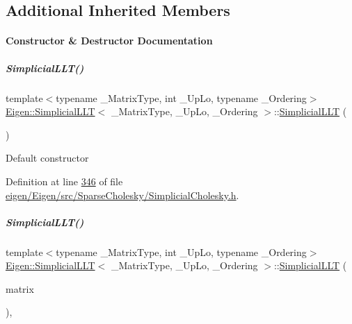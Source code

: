 \subsection*{Additional Inherited Members}


\paragraph{Constructor \& Destructor Documentation}
\mbox{\label{group___sparse_cholesky___module_ad25633e34d7c21b77fe05c873ffbe416}} 
\subparagraph{\texorpdfstring{Simplicial\+L\+L\+T()}{SimplicialLLT()}\hspace{0.1cm}{\footnotesize\ttfamily [1/4]}}
{\footnotesize\ttfamily template$<$typename \+\_\+\+Matrix\+Type, int \+\_\+\+Up\+Lo, typename \+\_\+\+Ordering$>$ \\
\hyperlink{group___sparse_cholesky___module_class_eigen_1_1_simplicial_l_l_t}{Eigen\+::\+Simplicial\+L\+LT}$<$ \+\_\+\+Matrix\+Type, \+\_\+\+Up\+Lo, \+\_\+\+Ordering $>$\+::\hyperlink{group___sparse_cholesky___module_class_eigen_1_1_simplicial_l_l_t}{Simplicial\+L\+LT} (\begin{DoxyParamCaption}{ }\end{DoxyParamCaption})\hspace{0.3cm}{\ttfamily [inline]}}

Default constructor 

Definition at line \hyperlink{eigen_2_eigen_2src_2_sparse_cholesky_2_simplicial_cholesky_8h_source_l00346}{346} of file \hyperlink{eigen_2_eigen_2src_2_sparse_cholesky_2_simplicial_cholesky_8h_source}{eigen/\+Eigen/src/\+Sparse\+Cholesky/\+Simplicial\+Cholesky.\+h}.

\mbox{\label{group___sparse_cholesky___module_a342735f17d0306aa5581e91010091427}} 
\subparagraph{\texorpdfstring{Simplicial\+L\+L\+T()}{SimplicialLLT()}\hspace{0.1cm}{\footnotesize\ttfamily [2/4]}}
{\footnotesize\ttfamily template$<$typename \+\_\+\+Matrix\+Type, int \+\_\+\+Up\+Lo, typename \+\_\+\+Ordering$>$ \\
\hyperlink{group___sparse_cholesky___module_class_eigen_1_1_simplicial_l_l_t}{Eigen\+::\+Simplicial\+L\+LT}$<$ \+\_\+\+Matrix\+Type, \+\_\+\+Up\+Lo, \+\_\+\+Ordering $>$\+::\hyperlink{group___sparse_cholesky___module_class_eigen_1_1_simplicial_l_l_t}{Simplicial\+L\+LT} (\begin{DoxyParamCaption}\item[{const Matrix\+Type \&}]{matrix }\end{DoxyParamCaption})\hspace{0.3cm}{\ttfamily [inline]}, {\ttfamily [explicit]}}

